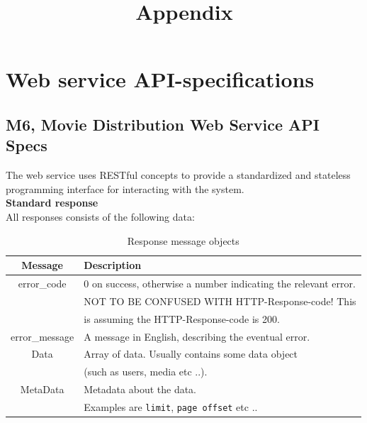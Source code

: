 \documentclass[11pt]{article}
\title{Appendix}
\begin{document}
\maketitle

\setcounter{tocdepth}{3}
\tableofcontents
\setcounter{page}{10}
\vspace*{1cm}

\newpage

\section{Web service API-specifications}
\subsection{M6, Movie Distribution Web Service API Specs}

The web service uses RESTful concepts to provide a standardized and stateless programming interface for interacting with the system. \\

\textbf{Standard response} \\
All responses consists of the following data:

\begin{table}[H]
\caption{Response message objects}
\begin{center}
\begin{tabular}{|c|l|}
\hline
 Message                     &  Description                                               \\
\hline
 error\_code   &  0 on success, otherwise a number indicating the relevant error.  \\
                             &  NOT TO BE CONFUSED WITH HTTP-Response-code! This   \\
                             &  is assuming the HTTP-Response-code is 200.                \\
\hline
 error\_message  &  A message in English, describing the eventual error.      \\
\hline
Data & Array of data. Usually contains some data object \\
	& (such as users, media etc ..).
\\
\hline
MetaData & Metadata about the data. \\
	& Examples are \texttt{limit}, \texttt{page offset} etc .. \\
\hline
\end{tabular}
\end{center}
\end{table}
\end{document}
